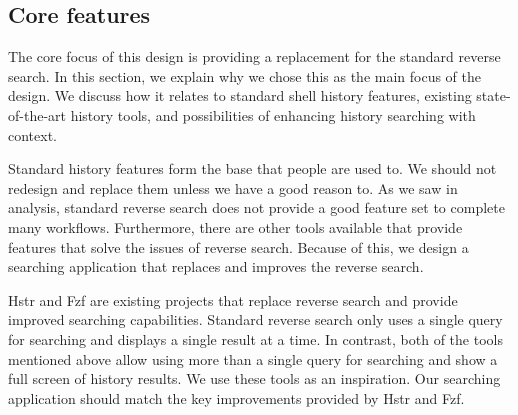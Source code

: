 \subsection{Core features}

The core focus of this design is providing a replacement for the standard reverse search. In this section, we explain why we chose this as the main focus of the design. We discuss how it relates to standard shell history features, existing state-of-the-art history tools, and possibilities of enhancing history searching with context.





Standard history features form the base that people are used to. We should not redesign and replace them unless we have a good reason to.
As we saw in analysis, standard reverse search does not provide a good feature set to complete many workflows. Furthermore, there are other tools available that provide features that solve the issues of reverse search. Because of this, we design a searching application that replaces and improves the reverse search.




Hstr\cite{toolshstr} and Fzf\cite{tools-fzf} are existing projects that replace reverse search and provide improved searching capabilities. 
Standard reverse search only uses a single query for searching and displays a single result at a time. In contrast, both of the tools mentioned above allow using more than a single query for searching and show a full screen of history results. We use these tools as an inspiration. Our searching application should match the key improvements provided by Hstr and Fzf. 

